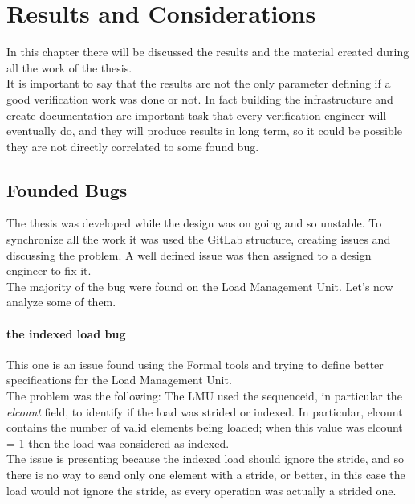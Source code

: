 \chapter{Results and Considerations}
In this chapter there will be discussed the results and the material created during all the work of the thesis.\\

It is important to say that the results are not the only parameter defining if a good verification work was done or not. In fact building the infrastructure and create documentation are important task that every verification engineer will eventually do, and they will produce results in long term, so it could be possible they are not directly correlated to some found bug.\\


\section{Founded Bugs}
The thesis was developed while the design was on going and so unstable. To synchronize all the work it was used the GitLab structure, creating issues and discussing the problem. A well defined issue was then assigned to a design engineer to fix it.\\

The majority of the bug were found on the Load Management Unit. Let's now analyze some of them.\\

\subsubsection{the indexed load bug}
This one is an issue found using the Formal tools and trying to define better specifications for the Load Management Unit.\\

The problem was the following:
The LMU used the sequence\+id, in particular the \emph{el\+count} field, to identify if the load was strided or indexed. In particular, el\+count contains the number of valid elements being loaded; when this value was el\+count = 1 then the load was considered as indexed.\\
The issue is presenting because the indexed load should ignore the stride, and so there is no way to send only one element with a stride, or better, in this case the load would not ignore the stride, as every operation was actually a strided one.\\

